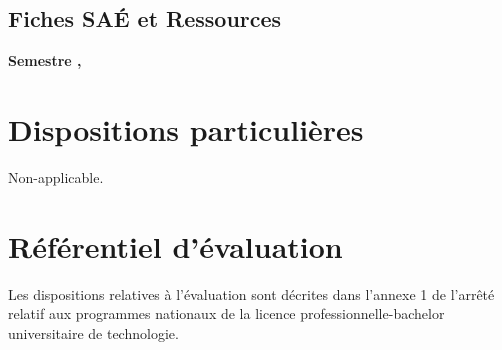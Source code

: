 \documentclass[10pt]{article}
\begin{document}
\subsection{Fiches SAÉ et Ressources}

\textbf{Semestre , }\\
\par

\section{Dispositions particulières}
Non-applicable.
\section{Référentiel d’évaluation}
Les dispositions relatives à l’évaluation sont décrites dans l’annexe 1
de l’arrêté relatif aux programmes nationaux de la licence
professionnelle-bachelor universitaire de technologie.
\newpage
\tableofcontents
\end{document}
